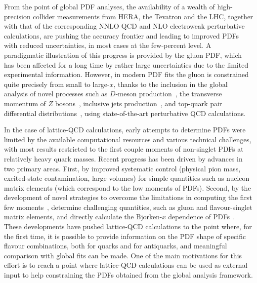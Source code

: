 From the point of
global PDF analyses, the availability of a wealth of high-precision collider measurements
from HERA, the Tevatron and the LHC, together with that of the corresponding
NNLO QCD and NLO electroweak perturbative calculations, are pushing the
accuracy frontier and leading to improved PDFs with reduced uncertainties,
in most cases at the few-percent level.
%
A paradigmatic illustration of this progress is provided by the gluon PDF, which has been
affected for a long time by rather large uncertainties due to the limited experimental
information.
%
However, in modern PDF fits the gluon is
constrained quite precisely from small to large-$x$,
thanks to the inclusion in the
global analysis of novel processes such as $D$-meson
production~\cite{Zenaiev:2015rfa,Gauld:2016kpd},
the transverse momentum of $Z$ bosons~\cite{Boughezal:2017nla},
inclusive jets production~\cite{Currie:2016bfm},
and top-quark pair differential
distributions~\cite{Czakon:2016olj,Guzzi:2014wia}, using state-of-the-art
perturbative QCD calculations.

In the case of lattice-QCD calculations, early attempts to determine PDFs were limited by the 
available computational resources and various technical challenges, with most results restricted to
the first couple moments of non-singlet PDFs at relatively heavy quark masses.
%
Recent progress has been driven by advances in two primary areas. 
First, by improved systematic control (physical pion mass, excited-state contamination, large volumes) 
for simple quantities such as nucleon matrix elements (which correspond to the low moments of PDFs).
Second, by the  development of novel strategies to overcome the limitations in computing the first few 
moments~\cite{Constantinou:2014tga,Syritsyn:2014saa,Lin:2012ev}, determine challenging quantities, 
such as gluon and flavour-singlet matrix elements, and directly calculate the Bjorken-$x$ dependence of PDFs \cite{Lin:2014zya,Alexandrou:2015rja,Chen:2016utp,Alexandrou:2016jqi}.
%
These developments have pushed lattice-QCD calculations
to the point where, for the first time, it is possible to provide information on the PDF shape
of specific flavour combinations, both for quarks and for antiquarks, and meaningful comparison with 
global fits can be made.
%
One of the main motivations for this effort is to reach a point where lattice-QCD
calculations can be used as external input to help constraining the
PDFs obtained from the global analysis framework.

